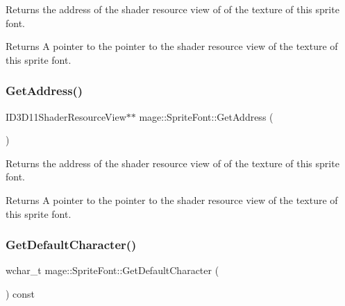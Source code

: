 Returns the address of the shader resource view of of the texture of this sprite font.

\begin{DoxyReturn}{Returns}
A pointer to the pointer to the shader resource view of the texture of this sprite font. 
\end{DoxyReturn}
\hypertarget{classmage_1_1_sprite_font_a6adc948fa1132f68b0f835e1453e37f7}{}\label{classmage_1_1_sprite_font_a6adc948fa1132f68b0f835e1453e37f7} 
\subsubsection{\texorpdfstring{Get\+Address()}{GetAddress()}\hspace{0.1cm}{\footnotesize\ttfamily [2/2]}}
{\footnotesize\ttfamily I\+D3\+D11\+Shader\+Resource\+View$\ast$$\ast$ mage\+::\+Sprite\+Font\+::\+Get\+Address (\begin{DoxyParamCaption}{ }\end{DoxyParamCaption})\hspace{0.3cm}{\ttfamily [noexcept]}}

Returns the address of the shader resource view of of the texture of this sprite font.

\begin{DoxyReturn}{Returns}
A pointer to the pointer to the shader resource view of the texture of this sprite font. 
\end{DoxyReturn}
\hypertarget{classmage_1_1_sprite_font_a9be513809e714558708cab21a22d7316}{}\label{classmage_1_1_sprite_font_a9be513809e714558708cab21a22d7316} 
\subsubsection{\texorpdfstring{Get\+Default\+Character()}{GetDefaultCharacter()}}
{\footnotesize\ttfamily wchar\+\_\+t mage\+::\+Sprite\+Font\+::\+Get\+Default\+Character (\begin{DoxyParamCaption}{ }\end{DoxyParamCaption}) const\hspace{0.3cm}{\ttfamily [noexcept]}}

